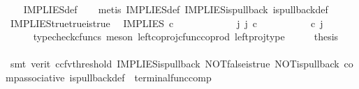 \begin{isabellebody}
%
\isadelimproof
\ \ %
\endisadelimproof
%
\isatagproof
{}\isamarkupfalse%
\ IMPLIES{\isacharunderscore}{\kern0pt}def\isanewline
\ \ \isamarkupfalse%
\ {\isacharparenleft}{\kern0pt}metis\ IMPLIES{\isacharunderscore}{\kern0pt}def\ IMPLIES{\isacharunderscore}{\kern0pt}is{\isacharunderscore}{\kern0pt}pullback\ is{\isacharunderscore}{\kern0pt}pullback{\isacharunderscore}{\kern0pt}def{\isacharparenright}{\kern0pt}%
\endisatagproof
{\isafoldproof}%
%
\isadelimproof
\isanewline
%
\endisadelimproof
\isanewline
{}\isamarkupfalse%
\ IMPLIES{\isacharunderscore}{\kern0pt}true{\isacharunderscore}{\kern0pt}true{\isacharunderscore}{\kern0pt}is{\isacharunderscore}{\kern0pt}true{\isacharcolon}{\kern0pt}\isanewline
\ \ {\isachardoublequoteopen}IMPLIES\ {\isasymcirc}\isactrlsub c\ {\isasymlangle}{\isasymt}{\isacharcomma}{\kern0pt}{\isasymt}{\isasymrangle}\ {\isacharequal}{\kern0pt}\ {\isasymt}{\isachardoublequoteclose}\isanewline
%
\isadelimproof
%
\endisadelimproof
%
\isatagproof
{}\isamarkupfalse%
\ {\isacharminus}{\kern0pt}\ \ \ \isanewline
\ \ \isamarkupfalse%
\ {\isachardoublequoteopen}{\isasymexists}\ j{\isachardot}{\kern0pt}\ j\ {\isasymin}\isactrlsub c\ {\isasymone}\ {\isasymCoprod}\ {\isacharparenleft}{\kern0pt}{\isasymone}{\isasymCoprod}{\isasymone}{\isacharparenright}{\kern0pt}\ {\isasymand}\ {\isacharparenleft}{\kern0pt}{\isasymlangle}{\isasymt}{\isacharcomma}{\kern0pt}\ {\isasymt}{\isasymrangle}{\isasymamalg}\ {\isacharparenleft}{\kern0pt}{\isasymlangle}{\isasymf}{\isacharcomma}{\kern0pt}\ {\isasymf}{\isasymrangle}\ {\isasymamalg}{\isasymlangle}{\isasymf}{\isacharcomma}{\kern0pt}\ {\isasymt}{\isasymrangle}{\isacharparenright}{\kern0pt}{\isacharparenright}{\kern0pt}\ {\isasymcirc}\isactrlsub c\ j\ \ {\isacharequal}{\kern0pt}\ {\isasymlangle}{\isasymt}{\isacharcomma}{\kern0pt}{\isasymt}{\isasymrangle}{\isachardoublequoteclose}\isanewline
\ \ \ \ \isamarkupfalse%
\ {\isacharparenleft}{\kern0pt}typecheck{\isacharunderscore}{\kern0pt}cfuncs{\isacharcomma}{\kern0pt}\ meson\ left{\isacharunderscore}{\kern0pt}coproj{\isacharunderscore}{\kern0pt}cfunc{\isacharunderscore}{\kern0pt}coprod\ left{\isacharunderscore}{\kern0pt}proj{\isacharunderscore}{\kern0pt}type{\isacharparenright}{\kern0pt}\isanewline
\ \ \isamarkupfalse%
\ \isamarkupfalse%
\ {\isacharquery}{\kern0pt}thesis\isanewline
\ \ \ \ \isamarkupfalse%
\ {\isacharparenleft}{\kern0pt}smt\ {\isacharparenleft}{\kern0pt}verit{\isacharcomma}{\kern0pt}\ ccfv{\isacharunderscore}{\kern0pt}threshold{\isacharparenright}{\kern0pt}\ IMPLIES{\isacharunderscore}{\kern0pt}is{\isacharunderscore}{\kern0pt}pullback\ NOT{\isacharunderscore}{\kern0pt}false{\isacharunderscore}{\kern0pt}is{\isacharunderscore}{\kern0pt}true\ NOT{\isacharunderscore}{\kern0pt}is{\isacharunderscore}{\kern0pt}pullback\ comp{\isacharunderscore}{\kern0pt}associative{}\ is{\isacharunderscore}{\kern0pt}pullback{\isacharunderscore}{\kern0pt}def\ \ terminal{\isacharunderscore}{\kern0pt}func{\isacharunderscore}{\kern0pt}comp{\isacharparenright}{\kern0pt}\isanewline

\end{isabellebody}
